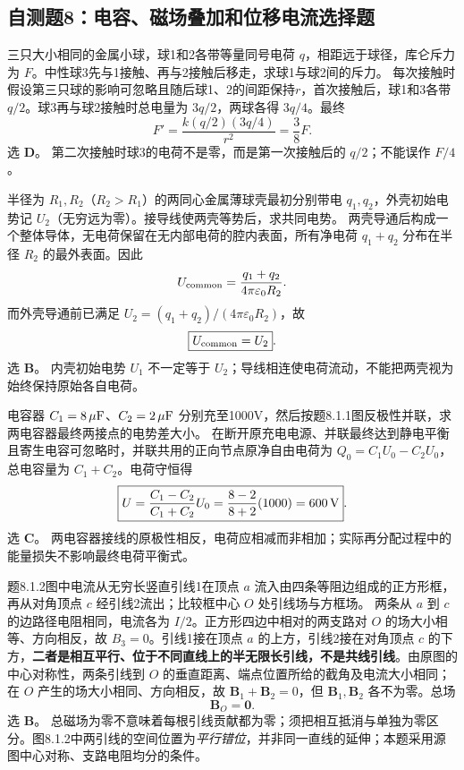 
\subsection{自测题8：电容、磁场叠加和位移电流选择题}

\problemtext 三只大小相同的金属小球，球1和2各带等量同号电荷 $q$，相距远于球径，库仑斥力为 $F$。中性球3先与1接触、再与2接触后移走，求球1与球2间的斥力。
\workings 每次接触时假设第三只球的影响可忽略且随后球1、2的间距保持$r$，首次接触后，球1和3各带 $q/2$。球3再与球2接触时总电量为 $3q/2$，两球各得 $3q/4$。最终
\[\boxed{F'=\frac{k(q/2)(3q/4)}{r^2}=\frac38F}.\]
选 \textbf{D}。
\crosscheck 第二次接触时球3的电荷不是零，而是第一次接触后的 $q/2$；不能误作 $F/4$。

\problemtext 半径为 $R_1,R_2$（$R_2>R_1$）的两同心金属薄球壳最初分别带电 $q_1,q_2$，外壳初始电势记 $U_2$（无穷远为零）。接导线使两壳等势后，求共同电势。
\workings 两壳导通后构成一个整体导体，无电荷保留在无内部电荷的腔内表面，所有净电荷 $q_1+q_2$ 分布在半径 $R_2$ 的最外表面。因此
\[U_{\rm common}=\frac{q_1+q_2}{4\pi\varepsilon_0R_2}.\]
而外壳导通前已满足 $U_2=(q_1+q_2)/(4\pi\varepsilon_0R_2)$，故
\[\boxed{U_{\rm common}=U_2}.\]
选 \textbf{B}。
\crosscheck 内壳初始电势 $U_1$ 不一定等于 $U_2$；导线相连使电荷流动，不能把两壳视为始终保持原始各自电荷。

\problemtext 电容器 $C_1=8\,\mu{\rm F}$、$C_2=2\,\mu{\rm F}$ 分别充至1000V，然后按题8.1.1图反极性并联，求两电容器最终两接点的电势差大小。
\workings 在断开原充电电源、并联最终达到静电平衡且寄生电容可忽略时，并联共用的正向节点原净自由电荷为 $Q_0=C_1U_0-C_2U_0$，总电容量为 $C_1+C_2$。电荷守恒得
\[
\boxed{U=\frac{C_1-C_2}{C_1+C_2}U_0
=\frac{8-2}{8+2}(1000)=600\,{\rm V}}.
\]
选 \textbf{C}。
\crosscheck 两电容器接线的原极性相反，电荷应相减而非相加；实际再分配过程中的能量损失不影响最终电荷平衡式。

\problemtext 题8.1.2图中电流从无穷长竖直引线1在顶点 $a$ 流入由四条等阻边组成的正方形框，再从对角顶点 $c$ 经引线2流出；比较框中心 $O$ 处引线场与方框场。
\workings 两条从 $a$ 到 $c$ 的边路径电阻相同，电流各为 $I/2$。正方形四边中相对的两支路对 $O$ 的场大小相等、方向相反，故 $\boxed{B_3=0}$。引线1接在顶点 $a$ 的上方，引线2接在对角顶点 $c$ 的下方，\textbf{二者是相互平行、位于不同直线上的半无限长引线，不是共线引线}。由原图的中心对称性，两条引线到 $O$ 的垂直距离、端点位置所给的截角及电流大小相同；在 $O$ 产生的场大小相同、方向相反，故 $\boxed{\bm B_1+\bm B_2=0}$，但 $\bm B_1,\bm B_2$ 各不为零。总场
\[\boxed{\bm B_O=\bm0}.\]
选 \textbf{B}。
\crosscheck 总磁场为零不意味着每根引线贡献都为零；须把相互抵消与单独为零区分。图8.1.2中两引线的空间位置为\emph{平行错位}，并非同一直线的延伸；本题采用源图中心对称、支路电阻均分的条件。

